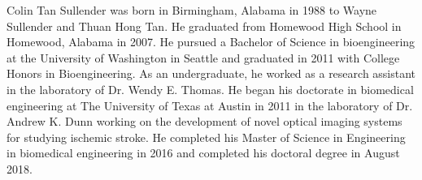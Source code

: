 \documentclass[12pt]{report}
\begin{document}




\begin{vita}
Colin Tan Sullender was born in Birmingham, Alabama in 1988 to Wayne Sullender and Thuan Hong Tan. He graduated from Homewood High School in Homewood, Alabama in 2007. He pursued a Bachelor of Science in bioengineering at the University of Washington in Seattle and graduated in 2011 with College Honors in Bioengineering. As an undergraduate, he worked as a research assistant in the laboratory of Dr. Wendy E. Thomas. He began his doctorate in biomedical engineering at The University of Texas at Austin in 2011 in the laboratory of Dr. Andrew K. Dunn working on the development of novel optical imaging systems for studying ischemic stroke. He completed his Master of Science in Engineering in biomedical engineering in 2016 and completed his doctoral degree in August 2018.
\end{vita}


\end{document}
